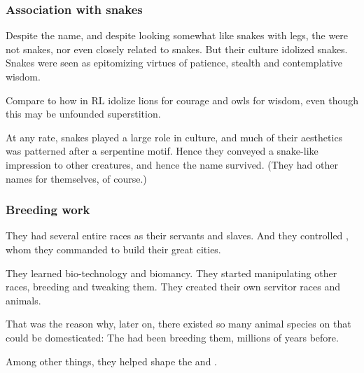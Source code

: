 







\subsubsection{Association with snakes}
Despite the name, and despite looking somewhat like snakes with legs, the \ophidians{} were not snakes, nor even closely related to snakes. 
But their culture idolized snakes. 
Snakes were seen as epitomizing virtues of patience, stealth and contemplative wisdom. 

Compare to how \humans{} in RL idolize lions for courage and owls for wisdom, even though this may be unfounded superstition. 

At any rate, snakes played a large role in \ophidian{} culture, and much of their aesthetics was patterned after a serpentine motif. 
Hence they conveyed a snake-like impression to other creatures, and hence the name \quo{\ophidian} survived. 
(They had other names for themselves, of course.)





\subsubsection{Breeding work}
They had several entire races as their servants and slaves. 
And they controlled \daemons{}, whom they commanded to build their great cities. 

They learned bio-technology and biomancy. 
They started manipulating other races, breeding and tweaking them. 
They created their own servitor races and animals. 

That was the reason why, later on, there existed so many animal species on \Miith{} that could be domesticated: 
The \ophidians{} had been breeding them, millions of years before. 

Among other things, they helped shape the  and . 

